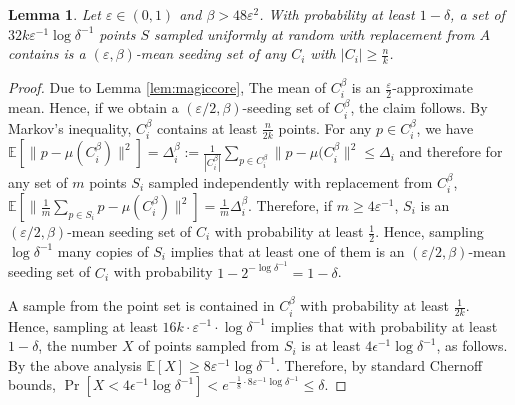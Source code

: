 \documentclass[10pt,a4paper]{amsart}
\newtheorem{lemma}[theorem]{Lemma}
\newcommand{\eps}{\varepsilon}
\newcommand{\mdef}[1]{{\ensuremath{#1}}\xspace}  %
\newcommand{\E}[2][]{\mdef{\underset{#1}{\mathbb{E}}\left[#2\right]}} %
\newcommand{\yr}[1]{{\textcolor{blue}{#1}}{}}
\newcommand{\cs}[1]{{\textcolor{red}{#1}}{}}
\begin{document}
\begin{lemma}
\label{lem:uniform}
Let $\varepsilon\in (0,1)$ and $\beta > 48\varepsilon^2$.
With probability at least $1-\delta$, a set of $32 k\varepsilon^{-1}\log \delta^{-1}$ points $S$ sampled uniformly at random with replacement from $A$ contains is a $(\varepsilon,\beta)$-mean seeding set of any $C_i$ with $|C_i|\geq \frac{n}{k}$.
\end{lemma}
\begin{proof}
Due to Lemma \ref{lem:magiccore}, The mean of $C_i^{\beta}$ is an $\frac{\varepsilon}{2}$-approximate mean. Hence, if we obtain a $(\varepsilon/2,\beta)$-seeding set of $C_i^{\beta}$, the claim follows. By Markov's inequality, $C_i^{\beta}$ contains at least $\frac{n}{2k}$ points.
For any $p\in C_i^{\beta}$, we have $\mathbb{E}\left[\|p-\mu(C_i^{\beta})\|^2\right] = \Delta_i^{\beta} := \frac{1}{|C_i^{\beta}|}\sum_{p\in C_i^{\beta}}\|p-\mu(C_i^{\beta}\|^2\leq \Delta_i$ and therefore for any set of $m$ points $S_i$ sampled independently with replacement from $C_i^{\beta}$, $\mathbb{E}\left[\|\frac{1}{m}\sum_{p\in S_i} p-\mu(C_i^{\beta})\|^2\right] = \frac{1}{m}\Delta_i^{\beta}$. Therefore, if $m\geq 4\varepsilon^{-1}$, $S_i$ is an $(\varepsilon/2,\beta)$-mean seeding set of $C_i$ with probability at least $\frac 1 2$. Hence, sampling $\log\delta^{-1}$ many copies of $S_i$ implies that at least one of them is an $(\varepsilon/2,\beta)$-mean seeding set of $C_i$ with probability $1-2^{-\log \delta^{-1}} = 1-\delta$.

A sample from the point set is contained in $C_i^{\beta}$ with probability at least $\frac{1}{2k}$. Hence, sampling at least $16k\cdot \varepsilon^{-1}\cdot \log \delta^{-1}$ implies that with probability at least $1-\delta$, the number $X$ of points sampled from $S_i$ is
at least $4\epsilon^{-1}\log\delta^{-1}$, as follows. By the above analysis $\E X \ge 8\eps^{-1}\log\delta^{-1}$. Therefore, by standard
Chernoff bounds, $\Pr[X < 4\epsilon^{-1}\log\delta^{-1}] < e^{-\frac 1 8\cdot 8\eps^{-1}\log\delta^{-1}} \le \delta$. 
\end{proof}


\end{document}
